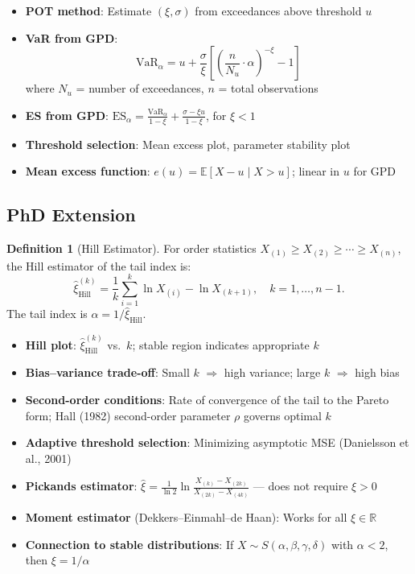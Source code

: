 \documentclass[11pt, a4paper]{article}
\newcommand{\E}{\mathbb{E}}
\newcommand{\R}{\mathbb{R}}
\theoremstyle{definition}
\newtheorem{defn}{Definition}
\begin{document}
\begin{itemize}
  \item \textbf{POT method}: Estimate $(\xi, \sigma)$ from exceedances above threshold $u$
  \item \textbf{VaR from GPD}:
  \[
    \text{VaR}_\alpha = u + \frac{\sigma}{\xi}\left[\left(\frac{n}{N_u}\cdot\alpha\right)^{-\xi} - 1\right]
  \]
  where $N_u$ = number of exceedances, $n$ = total observations
  \item \textbf{ES from GPD}: $\text{ES}_\alpha = \frac{\text{VaR}_\alpha}{1-\xi} + \frac{\sigma - \xi u}{1-\xi}$, for $\xi < 1$
  \item \textbf{Threshold selection}: Mean excess plot, parameter stability plot
  \item \textbf{Mean excess function}: $e(u) = \E[X - u \mid X > u]$; linear in $u$ for GPD
\end{itemize}

\subsection{PhD Extension}

\begin{defn}[Hill Estimator]
For order statistics $X_{(1)} \geq X_{(2)} \geq \cdots \geq X_{(n)}$, the Hill estimator of the tail index is:
\[
  \hat{\xi}_{\text{Hill}}^{(k)} = \frac{1}{k}\sum_{i=1}^{k}\ln X_{(i)} - \ln X_{(k+1)}, \quad k = 1, \ldots, n-1.
\]
The tail index is $\alpha = 1/\hat{\xi}_{\text{Hill}}$.
\end{defn}

\begin{itemize}
  \item \textbf{Hill plot}: $\hat{\xi}_{\text{Hill}}^{(k)}$ vs.\ $k$; stable region indicates appropriate $k$
  \item \textbf{Bias--variance trade-off}: Small $k$ $\Rightarrow$ high variance; large $k$ $\Rightarrow$ high bias
  \item \textbf{Second-order conditions}: Rate of convergence of the tail to the Pareto form; Hall (1982) second-order parameter $\rho$ governs optimal $k$
  \item \textbf{Adaptive threshold selection}: Minimizing asymptotic MSE (Danielsson et al., 2001)
  \item \textbf{Pickands estimator}: $\hat{\xi} = \frac{1}{\ln 2}\ln\frac{X_{(k)} - X_{(2k)}}{X_{(2k)} - X_{(4k)}}$ — does not require $\xi > 0$
  \item \textbf{Moment estimator} (Dekkers--Einmahl--de Haan): Works for all $\xi \in \R$
  \item \textbf{Connection to stable distributions}: If $X \sim S(\alpha, \beta, \gamma, \delta)$ with $\alpha < 2$, then $\xi = 1/\alpha$
\end{itemize}
\end{document}
